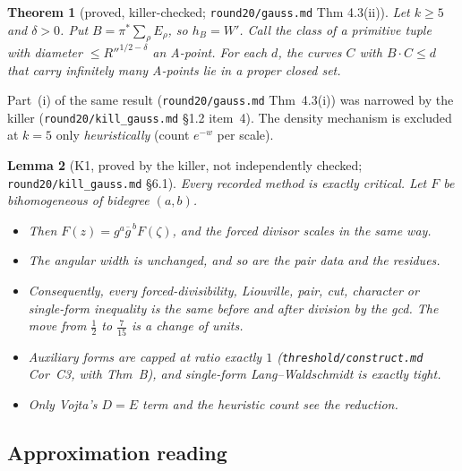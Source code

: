 \documentclass[11pt]{article}
\newtheorem{theorem}{Theorem}[section]
\newtheorem{lemma}[theorem]{Lemma}
\newcommand{\conj}[1]{\overline{#1}}
\newcommand{\rec}[1]{\texttt{#1}}
\begin{document}
\begin{theorem}[proved, killer-checked; \rec{round20/gauss.md} Thm 4.3(ii)]\label{thm:covering}
Let \(k\ge5\) and \(\delta>0\).  Put \(B=\pi^*\sum_\rho E_\rho\), so
\(h_B=W'\).  Call the class of a primitive tuple with diameter
\(\le R''^{1/2-\delta}\) an \emph{A-point}.  For each \(d\), the curves \(C\)
with \(B\cdot C\le d\) that carry infinitely many A-points lie in a proper
closed set.
\end{theorem}

Part~(i) of the same result (\rec{round20/gauss.md} Thm~4.3(i)) was narrowed by the killer
(\rec{round20/kill\_gauss.md} \S1.2 item~4).  The density mechanism is excluded
at \(k=5\) only \emph{heuristically} (count \(e^{-w}\) per scale).

\begin{lemma}[K1, proved by the killer, not independently checked; \rec{round20/kill\_gauss.md} \S6.1]\label{lem:K1}
Every recorded method is exactly critical.  Let \(F\) be bihomogeneous of
bidegree \((a,b)\).
\begin{itemize}
  \item Then \(F(z)=g^a\conj g^{\,b}F(\zeta)\), and the forced divisor scales
    in the same way.
  \item The angular width is unchanged, and so are the pair data and the
    residues.
  \item Consequently, every forced-divisibility, Liouville, pair, cut,
    character or single-form inequality is the same before and after division
    by the gcd.  The move from \(\frac12\) to \(\frac7{15}\) is a change of
    units.
  \item Auxiliary forms are capped at ratio exactly \(1\)
    (\rec{threshold/construct.md} Cor~C3, with Thm~B), and single-form
    Lang--Waldschmidt is exactly tight.
  \item Only Vojta's \(D=E\) term and the heuristic count see the reduction.
\end{itemize}
\end{lemma}

\subsection{Approximation reading}
\end{document}
